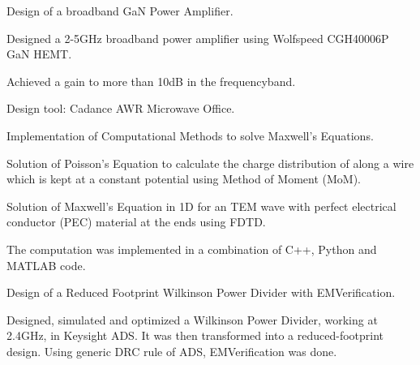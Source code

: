 

\begin{cventries}
  \cventry
    {Design of a broadband GaN Power Amplifier.} %
    {} %
    {} %
    {} %
    {
      \begin{cvitems} %
        \item {Designed a 2-5GHz broadband power amplifier using Wolfspeed CGH40006P GaN HEMT.}
        \item {Achieved a gain to more than 10dB in the frequencyband.}
        \item {Design tool: Cadance AWR Microwave Office.}
      \end{cvitems}
    }


  \cventry
    {Implementation of Computational Methods to solve Maxwell's Equations.} %
    {} %
    {} %
    {} %
    {
      \begin{cvitems} %
        \item {Solution of Poisson's Equation to calculate the charge distribution of along a wire which is kept at a constant potential using Method of Moment (MoM).}
        \item {Solution of Maxwell's Equation in 1D for an TEM wave with perfect electrical conductor (PEC) material at the ends using FDTD.}
        \item {The computation was implemented in a combination of C++, Python and MATLAB code.}
      \end{cvitems}
    }


  \cventry
    {Design of a Reduced Footprint Wilkinson Power Divider with EMVerification.} %
    {} %
    {} %
    {} %
    {
      \begin{cvitems} %
        \item {Designed, simulated and optimized a Wilkinson Power Divider, working at 2.4GHz, in Keysight ADS. It was then transformed into a reduced-footprint design. Using generic DRC rule of ADS, EMVerification was done.}
      \end{cvitems}
    }


\end{cventries}
